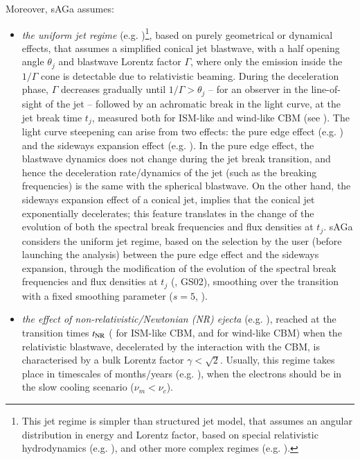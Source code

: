\documentclass{aa}
\begin{document}
Moreover, {\sc sAGa} assumes:
%
\begin{itemize}
%
\item \textit{the uniform jet regime} (e.g. \citealt{Granot07,Zhang19b})\footnote{This jet regime is simpler than structured jet model, that assumes an angular distribution in energy and Lorentz factor, based on special relativistic hydrodynamics (e.g. \citealt{DeColle12,Granot18,Coughlin20_jet}), and other more complex regimes (e.g. \citealp{Huang04,Peng05,Wu05,Granot18}).}, based on purely geometrical or dynamical effects, that assumes a simplified conical jet blastwave, with a half opening angle $\theta_j$ and blastwave Lorentz factor $\Gamma$, where only the emission inside the $1/\Gamma$ cone is detectable due to relativistic beaming.
During the deceleration phase, $\Gamma$ decreases gradually until $1/\Gamma > \theta_j$ -- for an observer in the line-of-sight of the jet -- followed by an achromatic break in the light curve, at the jet break time $t_j$, measured both for ISM-like and wind-like CBM (see \citealp{Waxman97,Rhoads99,Sari99b,ChevalierLi00,Wang18}).
The light curve steepening can arise from two effects: the pure edge effect (e.g. \citealt{Panaitescu98,Granot07}) and the sideways expansion effect (e.g. \citealt{Rhoads99,Sari99b}).
In the pure edge effect, the blastwave dynamics does not change during the jet break transition, and hence the deceleration rate/dynamics of the jet (such as the breaking frequencies) is the same with the spherical blastwave.
On the other hand, the sideways expansion effect of a conical jet, implies that the conical jet exponentially decelerates; this feature translates in the change of the evolution of both the spectral break frequencies and flux densities at $t_j$.
{\sc sAGa} considers the uniform jet regime, based on the selection by the user (before launching the analysis) between the pure edge effect and the sideways expansion, through the modification of the evolution of the spectral break frequencies and flux densities at $t_{j}$ (\citealt{Sari99b,Panaitescu02,Sari06,Granot07}, GS02), smoothing over the transition with a fixed smoothing parameter ($s = 5$, \citealt{Granot01}).
%
\item \textit{the effect of non-relativistic/Newtonian (NR) ejecta} (e.g. \citealt{Wijers97,Zhang19b}), reached at the transition times $t_{\rm NR}$ (\citealt{Waxman97} for ISM-like CBM, and \citealt{ChevalierLi00} for wind-like CBM) when the relativistic blastwave, decelerated by the interaction with the CBM, is characterised by a bulk Lorentz factor $\gamma < \sqrt{2}$. Usually, this regime takes place in timescales of months/years (e.g. \citealt{Livio00,Zhang09b}), when the electrons should be in the slow cooling scenario ($\nu_m < \nu_c$).

\end{itemize}
\end{document}
